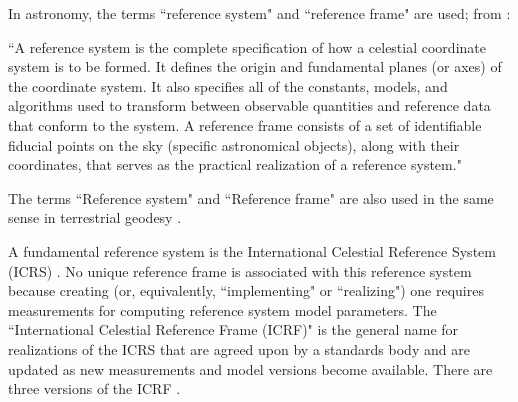 \documentclass[draft]{agujournal2019}
\begin{document}
In astronomy, the terms ``reference system" and ``reference frame" are used; from :

``A reference system is the complete specification of how a celestial coordinate system is to be formed. It defines the origin and fundamental planes (or axes) of the coordinate system. It also specifies all of the constants, models, and algorithms used to transform between observable quantities and reference data that conform to the system. A reference frame consists of a set of identifiable fiducial points on the sky (specific astronomical objects), along with their coordinates, that serves as the practical realization of a reference system."

The terms ``Reference system" and ``Reference frame" are also used in the same sense in terrestrial geodesy \cite{Seitz2014}.




A fundamental reference system is the International Celestial Reference System (ICRS) \cite{Petit2010}. No unique reference frame is associated with this reference system because creating (or, equivalently, ``implementing" or ``realizing") one requires measurements for computing reference system model parameters. The ``International Celestial Reference Frame (ICRF)" is the general name for realizations of the ICRS that are agreed upon by a standards body and are updated as new measurements and model versions become available. There are three versions of the ICRF \cite{Charlot2020}. 
\end{document}
